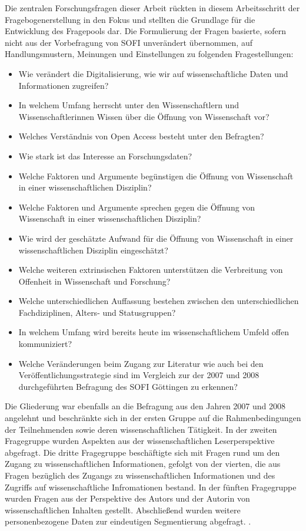 Die zentralen Forschungsfragen dieser Arbeit rückten in diesem Arbeitsschritt der Fragebogenerstellung in den Fokus und stellten die Grundlage für die Entwicklung des Fragepools dar. Die Formulierung der Fragen basierte, sofern nicht aus der Vorbefragung von SOFI unverändert übernommen, auf Handlungsmustern, Meinungen und Einstellungen zu folgenden Fragestellungen:
\begin{itemize}
\item Wie verändert die Digitalisierung, wie wir auf wissenschaftliche Daten und Informationen zugreifen?
\item In welchem Umfang herrscht unter den Wissenschaftlern und Wissenschaftlerinnen Wissen über die Öffnung von Wissenschaft vor? 
\item Welches Verständnis von Open Access besteht unter den Befragten? 
\item Wie stark ist das Interesse an Forschungsdaten? 
\item Welche Faktoren und Argumente begünstigen die Öffnung von Wissenschaft in einer wissenschaftlichen Disziplin? 
\item Welche Faktoren und Argumente sprechen gegen die Öffnung von Wissenschaft in einer wissenschaftlichen Disziplin? 
\item Wie wird der geschätzte Aufwand für die Öffnung von Wissenschaft in einer wissenschaftlichen Disziplin eingeschätzt?
\item Welche weiteren extrinsischen Faktoren unterstützen die Verbreitung von Offenheit in Wissenschaft und Forschung? 
\item Welche unterschiedlichen Auffassung bestehen zwischen den unterschiedlichen Fachdiziplinen, Alters- und Statusgruppen?
\item In welchem Umfang wird bereits heute im wissenschaftlichem Umfeld offen kommuniziert?
\item Welche Veränderungen beim Zugang zur Literatur wie auch bei den Veröffentlichungsstrategie sind im Vergleich zur der 2007 und 2008 durchgeführten Befragung des SOFI Göttingen zu erkennen?
\end{itemize}

Die Gliederung war ebenfalls an die Befragung aus den Jahren 2007 und 2008 angelehnt und beschränkte sich in der ersten Gruppe auf die Rahmenbedingungen der Teilnehmenden sowie deren wissenschaftlichen Tätigkeit. In der zweiten Fragegruppe wurden Aspekten aus der wissenschaftlichen Leserperspektive abgefragt. Die dritte Fragegruppe beschäftigte sich mit Fragen rund um den Zugang zu wissenschaftlichen Informationen, gefolgt von der vierten, die aus Fragen bezüglich des Zugangs zu wissenschaftlichen Informationen und des Zugriffs auf wissenschaftliche Infromationen bestand. In der fünften Fragegruppe wurden Fragen aus der Perspektive des Autors und der Autorin von wissenschaftlichen Inhalten gestellt. Abschließend wurden weitere personenbezogene Daten zur eindeutigen Segmentierung abgefragt. .

